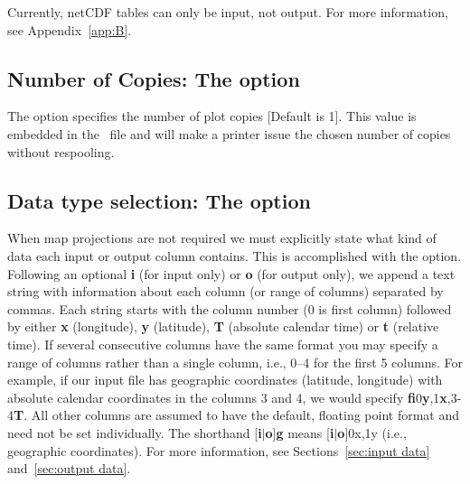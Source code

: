 Currently, netCDF tables can only be input, not output.
For more information, see Appendix~\ref{app:B}.

\subsection{Number of Copies: The  option}

The  option specifies the number of plot copies [Default is 1].  This
value is embedded in the \PS\ file and will make a printer issue the chosen
number of copies without respooling.

\subsection{Data type selection: The  option}
\label{sec:fg_option}

When map projections are not required we must explicitly state
what kind of data each input or output column contains.  This is accomplished with
the  option.  Following an optional \textbf{i} (for input only) or \textbf{o} (for output
only), we append a text string with information about each column (or range of columns) separated by commas.
Each string starts with the column number (0 is first column) followed by either
\textbf{x} (longitude), \textbf{y} (latitude), \textbf{T} (absolute calendar time) or \textbf{t} (relative time).  If
several consecutive columns have the same format you may specify a range of columns
rather than a single column, i.e., 0--4 for the first 5 columns.  For example, if our
input file has geographic coordinates (latitude, longitude) with absolute calendar
coordinates in the columns 3 and 4, we would specify \textbf{fi}0\textbf{y},1\textbf{x},3-4\textbf{T}.  All other columns
are assumed to have the default, floating point format and need not be set individually.
The shorthand [\textbf{i}$|$\textbf{o}]\textbf{g} means [\textbf{i}$|$\textbf{o}]0x,1y (i.e., geographic coordinates).
For more information, see Sections~\ref{sec:input data} and~\ref{sec:output data}.

